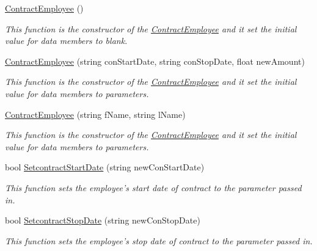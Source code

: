 \begin{DoxyCompactItemize}
\item 
\hyperlink{class_all_employees_1_1_contract_employee_afb78892e913ff2a34aed4d7b78d6c9f7}{Contract\-Employee} ()
\begin{DoxyCompactList}\small\item\em This function is the constructor of the \hyperlink{class_all_employees_1_1_contract_employee}{Contract\-Employee} and it set the initial value for data members to blank. \end{DoxyCompactList}\item 
\hyperlink{class_all_employees_1_1_contract_employee_a10cf36cf94500aefd99ae2f1d5f90ed2}{Contract\-Employee} (string con\-Start\-Date, string con\-Stop\-Date, float new\-Amount)
\begin{DoxyCompactList}\small\item\em This function is the constructor of the \hyperlink{class_all_employees_1_1_contract_employee}{Contract\-Employee} and it set the initial value for data members to parameters. \end{DoxyCompactList}\item 
\hyperlink{class_all_employees_1_1_contract_employee_a29cd5dedb0769d79da50a7653e056d52}{Contract\-Employee} (string f\-Name, string l\-Name)
\begin{DoxyCompactList}\small\item\em This function is the constructor of the \hyperlink{class_all_employees_1_1_contract_employee}{Contract\-Employee} and it set the initial value for data members to parameters. \end{DoxyCompactList}\item 
bool \hyperlink{class_all_employees_1_1_contract_employee_a4c8c59b291072d20de69fbca7de333aa}{Setcontract\-Start\-Date} (string new\-Con\-Start\-Date)
\begin{DoxyCompactList}\small\item\em This function sets the employee's start date of contract to the parameter passed in. \end{DoxyCompactList}\item 
bool \hyperlink{class_all_employees_1_1_contract_employee_a13166d1b41e136880ed1840759b243dc}{Setcontract\-Stop\-Date} (string new\-Con\-Stop\-Date)
\begin{DoxyCompactList}\small\item\em This function sets the employee's stop date of contract to the parameter passed in. \end{DoxyCompactList}\item 

\end{DoxyCompactItemize}
